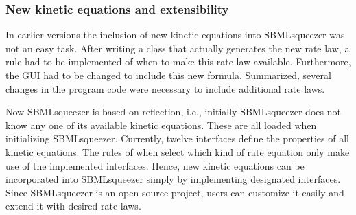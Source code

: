 \subsubsection{New kinetic equations and extensibility}

In earlier versions the inclusion of new kinetic equations into SBMLsqueezer was
not an easy task. After writing a class that actually generates the new rate
law, a rule had to be implemented of when to make this rate law available.
Furthermore, the GUI had to be changed to include this new formula. Summarized,
several changes in the program code were necessary to include additional rate
laws.

Now SBMLsqueezer is based on \Java reflection, i.e., initially SBMLsqueezer does
not know any one of its available kinetic equations. These are all loaded when
initializing SBMLsqueezer. Currently, twelve interfaces define the properties of
all kinetic equations. The rules of when select which kind of rate equation only
make use of the implemented interfaces. Hence, new kinetic equations can be
incorporated into SBMLsqueezer simply by implementing designated interfaces.
Since SBMLsqueezer is an open-source project, users can customize it easily and
extend it with desired rate laws.

